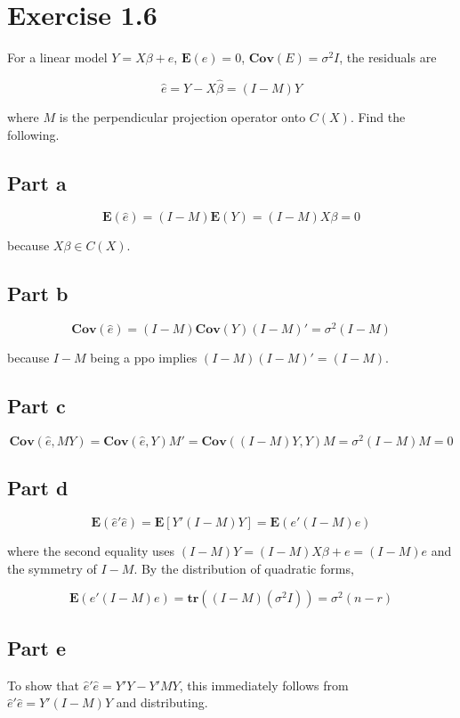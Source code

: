\documentclass{article}
\newcommand{\E}{\boldsymbol{E}}
\newcommand{\cov}{\boldsymbol{Cov}}
\newcommand{\tr}{\boldsymbol{tr}}
\begin{document}
\section*{Exercise 1.6}

For a linear model $Y=X\beta+e$, $\E(e)=0$, $\cov(E)=\sigma^2I$, the residuals are

\[
\hat{e} = Y-X\hat{\beta} = (I-M)Y
\]

where $M$ is the perpendicular projection operator onto $C(X)$. Find the following.

\subsection*{Part a}

\[
\E(\hat{e}) = (I-M)\E(Y) = (I-M)X\beta = 0
\]

because $X\beta \in C(X)$.

\subsection*{Part b}

\[
\cov(\hat{e}) = (I-M)\cov(Y)(I-M)' = \sigma^2(I-M)
\]

because $I-M$ being a ppo implies $(I-M)(I-M)' = (I-M)$.

\subsection*{Part c}

\[
\cov(\hat{e},MY) = \cov(\hat{e},Y)M' = \cov((I-M)Y,Y)M = \sigma^2(I-M)M = 0
\]

\subsection*{Part d}

\[
\E(\hat{e}'\hat{e}) = \E[Y'(I-M)Y] = \E(e'(I-M)e)
\]

where the second equality uses $(I-M)Y = (I-M)X\beta+e = (I-M)e$ and the symmetry of $I-M$. By the distribution of quadratic forms,

\[
\E(e'(I-M)e) = \tr((I-M)(\sigma^2I)) = \sigma^2(n-r)
\]

\subsection*{Part e}

To show that $\hat{e}'\hat{e} = Y'Y-Y'MY$, this immediately follows from $\hat{e}'\hat{e}=Y'(I-M)Y$ and distributing.
\end{document}

